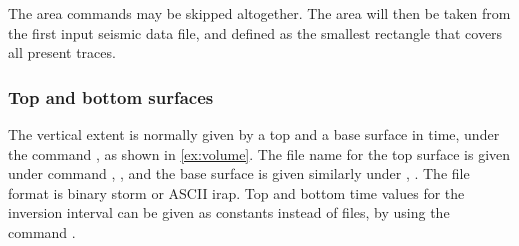 The area commands may be skipped altogether. The area will then be taken from the first input seismic data file, and defined as the smallest rectangle that covers all present traces.

\subsubsection{Top and bottom surfaces}
The vertical extent is normally given by a top and a base surface in time, under the command , as shown in \autoref{ex:volume}. The file name for the top surface is given under command , , and the base surface is given similarly under , . The file format is binary storm or ASCII irap. Top and bottom time values for the inversion interval can be given as constants instead of files, by using the command . 

